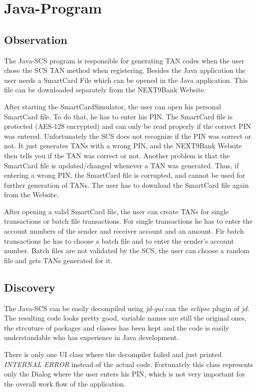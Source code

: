 \chapter{Java-Program}

\section{Observation}

The Java-SCS program is responsible for generating TAN codes when the user chose the SCS TAN method when registering. Besides the Java application the user needs a SmartCard File which can be opened in the Java application. This file can be downloaded separately from the NEXT9Bank Website.

After starting the SmartCardSimulator, the user can open his personal SmartCard file. To do that, he has to enter his PIN. The SmartCard file is protected (AES-128 encrypted) and can only be read properly if the correct PIN was entered. Unfortunately the SCS does not recognize if the PIN was correct or not. It just generates TANs with a wrong PIN, and the NEXT9Bank Website then tells you if the TAN was correct or not. Another problem is that the SmartCard file is updated/changed whenever a TAN was generated. Thus, if entering a wrong PIN, the SmartCard file is corrupted, and cannot be used for further generation of TANs. The user has to download the SmartCard file again from the Website.

After opening a valid SmartCard file, the user can create TANs for single transactions or batch file transactions. For single transactions he has to enter the account numbers of the sender and receiver account and an amount. Fir batch transactions he has to choose a batch file and to enter the sender's account number. Batch files are not validated by the SCS, the user can choose a random file and gets TANs generated for it.

\section{Discovery}

The Java-SCS can be easily decompiled using \textit{jd-gui} can the \textit{eclipse} plugin of \textit{jd}. The resulting code looks pretty good, variable names are still the original ones, the strcuture of packages and classes has been kept and the code is easily understandable who has experience in Java development.

There is only one UI class where the decompiler failed and just printed \textit{INTERNAL ERROR} instead of the actual code. Fortunately this class represents only the Dialog where the user enters his PIN, which is not very important for the overall work flow of the application.

